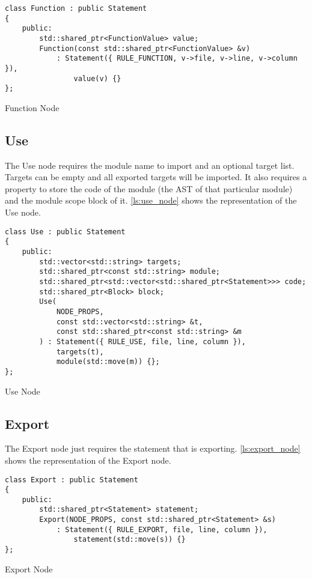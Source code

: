 \begin{listing}[H]
\begin{verbatim}
class Function : public Statement
{
    public:
        std::shared_ptr<FunctionValue> value;
        Function(const std::shared_ptr<FunctionValue> &v)
            : Statement({ RULE_FUNCTION, v->file, v->line, v->column }),
                value(v) {}
};
\end{verbatim}
\caption{Function Node}
\label{ls:function_node}
\end{listing}

\subsection{Use}

The Use node requires the module name to import and an optional target list. Targets can be empty and all exported targets
will be imported. It also requires a property to store the code of the module (the AST of that particular module) and
the module scope block of it.
\autoref{ls:use_node} shows the representation of the Use node.

\begin{listing}[H]
\begin{verbatim}
class Use : public Statement
{
    public:
        std::vector<std::string> targets;
        std::shared_ptr<const std::string> module;
        std::shared_ptr<std::vector<std::shared_ptr<Statement>>> code;
        std::shared_ptr<Block> block;
        Use(
            NODE_PROPS,
            const std::vector<std::string> &t,
            const std::shared_ptr<const std::string> &m
        ) : Statement({ RULE_USE, file, line, column }),
            targets(t),
            module(std::move(m)) {};
};
\end{verbatim}
\caption{Use Node}
\label{ls:use_node}
\end{listing}

\subsection{Export}

The Export node just requires the statement that is exporting.
\autoref{ls:export_node} shows the representation of the Export node.

\begin{listing}[H]
\begin{verbatim}
class Export : public Statement
{
    public:
        std::shared_ptr<Statement> statement;
        Export(NODE_PROPS, const std::shared_ptr<Statement> &s)
            : Statement({ RULE_EXPORT, file, line, column }),
                statement(std::move(s)) {}
};
\end{verbatim}
\caption{Export Node}
\label{ls:export_node}
\end{listing}

